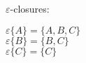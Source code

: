 
$\varepsilon$-closures: 
\begin{center}
    \noindent $\varepsilon\{A\} = \{A, B, C\}$ \\
    $\varepsilon\{B\} = \{B, C\}$ \\
    $\varepsilon\{C\} = \{C\}$ \\
\end{center}